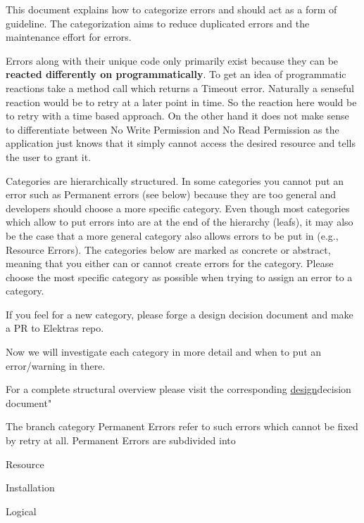 This document explains how to categorize errors and should act as a form of guideline. The categorization aims to reduce duplicated errors and the maintenance effort for errors.

Errors along with their unique code only primarily exist because they can be {\bfseries{reacted differently on programmatically}}. To get an idea of programmatic reactions take a method call which returns a {\ttfamily Timeout} error. Naturally a senseful reaction would be to retry at a later point in time. So the reaction here would be to retry with a time based approach. On the other hand it does not make sense to differentiate between {\ttfamily No Write Permission} and {\ttfamily No Read Permission} as the application just knows that it simply cannot access the desired resource and tells the user to grant it.

Categories are hierarchically structured. In some categories you cannot put an error such as {\ttfamily Permanent errors} (see below) because they are too general and developers should choose a more specific category. Even though most categories which allow to put errors into are at the end of the hierarchy (leafs), it may also be the case that a more general category also allows errors to be put in (e.\+g., {\ttfamily Resource Errors}). The categories below are marked as {\ttfamily concrete} or {\ttfamily abstract}, meaning that you either can or cannot create errors for the category. Please choose the most specific category as possible when trying to assign an error to a category.

If you feel for a new category, please forge a design decision document and make a PR to Elektra\textquotesingle{}s repo.

Now we will investigate each category in more detail and when to put an error/warning in there.

For a complete structural overview please visit the corresponding \mbox{\hyperlink{doc_decisions_error_codes_md}{design}}decision document"

The branch category {\ttfamily Permanent Errors} refer to such errors which cannot be fixed by retry at all. {\ttfamily Permanent Errors} are subdivided into


\begin{DoxyItemize}
\item Resource
\item Installation
\item Logical
\end{DoxyItemize}

